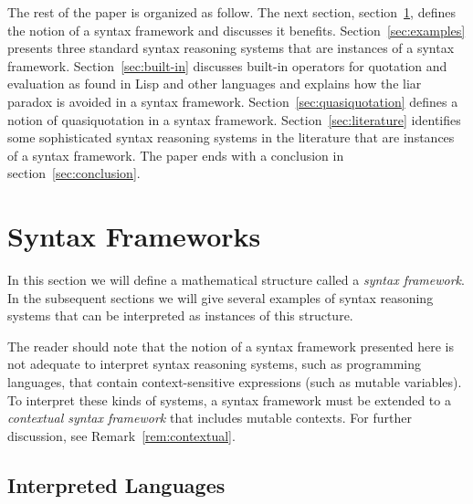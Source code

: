 \documentclass[11pt,fleqn]{article}
\begin{document}
\iffalse
The ideas underlying our notion of a syntax framework are not deep,
but they tend to be confusing since they deal with the interplay of
syntax and semantics.  This confusion is well known to programmers who
are trying to sort out the meanings of \texttt{quote} and
\texttt{eval} in Lisp.  Our objective is to explicate what quotation
and evaluation are and how they interact.  We believe that these ideas
are useful in both logic and programming.  Most of the paper is
devoted to examples and definitions, but some applications of syntax
frameworks are briefly discussed.
\fi

The rest of the paper is organized as follow.  The next section,
section~\ref{sec:syn-frame}, defines the notion of a syntax framework
and discusses it benefits.  Section~\ref{sec:examples} presents three
standard syntax reasoning systems that are instances of a syntax
framework.  Section~\ref{sec:built-in} discusses built-in operators
for quotation and evaluation as found in Lisp and other languages and
explains how the liar paradox is avoided in a syntax framework.
Section~\ref{sec:quasiquotation} defines a notion of quasiquotation in
a syntax framework.  Section~\ref{sec:literature} identifies some
sophisticated syntax reasoning systems in the literature that are
instances of a syntax framework.  The paper ends with a conclusion in
section~\ref{sec:conclusion}.

\section{Syntax Frameworks} \label{sec:syn-frame}

In this section we will define a mathematical structure called a
\emph{syntax framework}.  In the subsequent sections we will give
several examples of syntax reasoning systems that can be interpreted
as instances of this structure.

The reader should note that the notion of a syntax framework presented
here is not adequate to interpret syntax reasoning systems, such as
programming languages, that contain context-sensitive expressions
(such as mutable variables).  To interpret these kinds of systems, a
syntax framework must be extended to a \emph{contextual syntax
  framework} that includes mutable contexts.  For further discussion,
see Remark~\ref{rem:contextual}.

\subsection{Interpreted Languages} \label{subsec:inter-lang}
\end{document}

